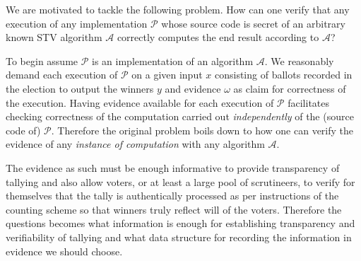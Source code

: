 \documentclass[10pt,conference]{IEEEtran}
\begin{document}
We are motivated to 
tackle the following problem. How can one verify that any execution of any implementation $\mathcal{P}$ whose source code is secret of an arbitrary  known STV algorithm $\mathcal{A}$ correctly computes the end result according to  $\mathcal{A}$?  



To begin 
assume $\mathcal{P}$ is an implementation of an algorithm $\mathcal{A}$. We reasonably demand each execution of $\mathcal{P}$ on a given input $x$ consisting of ballots recorded in the election to output the winners $y$ and evidence $\omega$ as claim  for correctness of the execution.
 Having evidence available for each execution of $\mathcal{P}$ facilitates checking correctness of the computation carried out \emph{independently} of the (source code of) $\mathcal{P}$. Therefore the original problem boils down to how one can verify the evidence of any \emph{instance of computation} with any algorithm $\mathcal{A}$.


The evidence as such must be enough informative to provide transparency of tallying and also allow  voters, or at least a large pool of scrutineers, to verify for themselves that the tally is authentically processed as per instructions of the counting scheme  so that winners truly reflect will of the voters. 
Therefore the questions becomes what information is enough 
for establishing transparency and verifiability of tallying  and what data structure for recording the information in evidence we should choose.
\end{document}
